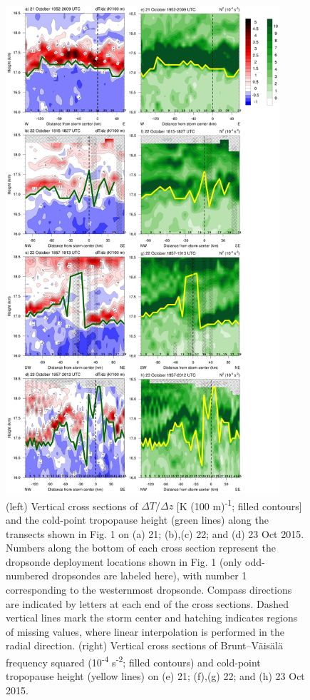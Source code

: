 \begin{figure}[ht]
\centerline{\includegraphics[width=24pc]{figures/fig04_dtdz+stab.png}}
\caption{(left) Vertical cross sections of $\Delta T/\Delta z$ [K (100 m)\textsuperscript{-1}; filled contours] and the cold-point tropopause height (green lines) along the transects shown in Fig. 1 on (a) 21; (b),(c) 22; and (d) 23 Oct 2015. Numbers along the bottom of each cross section represent the dropsonde deployment locations shown in Fig. 1 (only odd-numbered dropsondes are labeled here), with number 1 corresponding to the westernmost dropsonde. Compass directions are indicated by letters at each end of the cross sections. Dashed vertical lines mark the storm center and hatching indicates regions of missing values, where linear interpolation is performed in the radial direction. (right) Vertical cross sections of Brunt–Väisälä frequency squared (10\textsuperscript{-4} s\textsuperscript{-2}; filled contours) and cold-point tropopause height (yellow lines) on (e) 21; (f),(g) 22; and (h) 23 Oct 2015.}
\label{fig:stab}
\end{figure}

